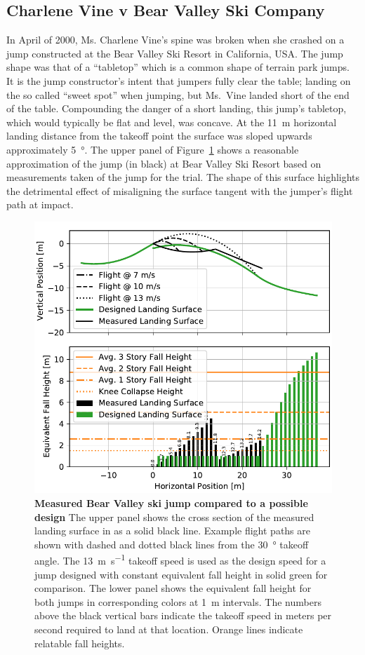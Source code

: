 \documentclass{article}
\begin{document}
\subsection{Charlene Vine v Bear Valley Ski Company}
%
In April of 2000, Ms. Charlene Vine's spine was broken when she crashed on a
jump constructed at the Bear Valley Ski Resort in California, USA. The jump
shape was that of a ``tabletop'' which is a common shape of terrain park jumps.
It is the jump constructor's intent that jumpers fully clear the table; landing
on the so called ``sweet spot'' when jumping, but Ms.~Vine landed short of the
end of the table.
Compounding the danger of a short landing, this jump's tabletop, which
would typically be flat and level, was concave.
At the 11~\si{\meter} horizontal landing distance from the takeoff point the surface
was sloped upwards approximately 5~\si{\degree}.
The upper panel of Figure~\ref{fig:vine-v-bear-valley} shows a reasonable
approximation of the jump (in black) at Bear Valley Ski Resort based on
measurements taken of the jump for the trial.
The shape of this surface highlights the detrimental effect of misaligning the
surface tangent with the jumper's flight path at impact.
%
\begin{figure}
  \centering
  \includegraphics[width=5.25in]{figures/vine-v-bear-valley.pdf}
  \caption{\textbf{Measured Bear Valley ski jump compared to a possible design}
  The upper panel shows the cross section of the measured landing surface in as
  a solid black line. Example flight paths are shown with dashed and dotted
  black lines from the 30~\si{\degree} takeoff angle. The
  13~\si{\meter\per\second} takeoff speed is used as the design speed for a
  jump designed with constant equivalent fall height in solid green for
  comparison. The lower panel shows the equivalent fall height for both jumps
  in corresponding colors at 1~\si{\meter} intervals. The numbers above the
  black vertical bars indicate the takeoff speed in meters per second required
  to land at that location. Orange lines indicate relatable fall heights.}
  \label{fig:vine-v-bear-valley}
\end{figure}
\end{document}
